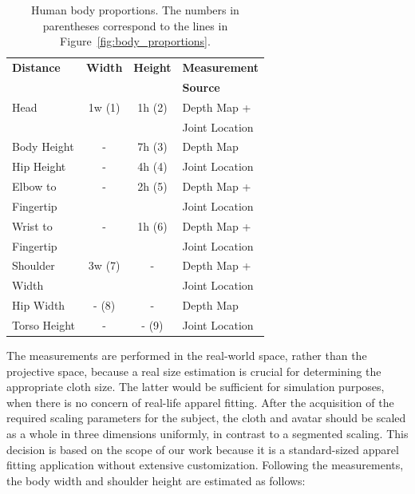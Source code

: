 \documentclass[number,preprint,review,12pt]{elsarticle}
\begin{document}
\singlespacing
\begin{table}
\begin{center}
\begin{tabular}{|l|c|c|l|}
\hline
\textbf{Distance} & \textbf{Width} & \textbf{Height} & \textbf{Measurement} \\ 
\textbf{        } & \textbf{     } & \textbf{      } & \textbf{Source} \\ \hline
Head & 1w (1) & 1h (2) & Depth Map + \\ 
     &        &        & Joint Location \\ \hline
Body Height & - & 7h (3) & Depth Map \\ \hline
Hip Height & - & 4h (4) & Joint Location \\ \hline
Elbow to & - & 2h (5) & Depth Map + \\ 
Fingertip &   &       & Joint Location \\ \hline
Wrist to  & - & 1h (6) & Depth Map + \\ 
Fingertip &   &       & Joint Location \\ \hline
Shoulder  & 3w (7) & - & Depth Map + \\ 
Width     &  &   & Joint Location \\ \hline
Hip Width & - (8) & - & Depth Map \\ \hline
Torso Height & - & - (9) & Joint Location \\ 
\hline
\end{tabular}
\end{center}
\caption{Human body proportions. The numbers in parentheses correspond 
to the lines in Figure~\ref{fig:body_proportions}.}
\label{tbl:human_body_proportions}
\end{table}

\doublespacing

The measurements are performed in the real-world space, rather than the projective space, because a real size estimation is crucial for determining the appropriate cloth size. The latter would be sufficient for simulation purposes, when there is no concern of real-life apparel fitting. After the acquisition of the required scaling parameters for the subject, the cloth and avatar should be scaled as a whole in three dimensions uniformly, in contrast to a segmented scaling. This decision is based on the scope of our work because it is a standard-sized apparel fitting application without extensive customization. Following the measurements, the body width and shoulder height are estimated as follows:
\end{document}
